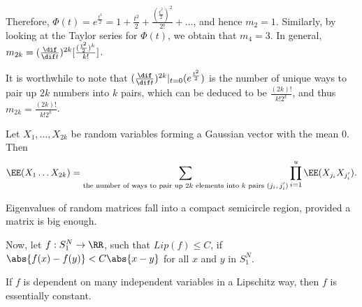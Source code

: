 \documentclass[11pt]{scrartcl}
\begin{document}
  Therefore,
  $\Phi(t) = e^{\frac{t^{2}}{2}} = 1 + \frac{t^{2}}{2} +
  \frac{(\frac{t^{2}}{2})^{2}}{2!} + \dots$, and hence $m_{2} = 1$.
  Similarly, by looking at the Taylor series for $\Phi(t)$, we obtain
  that $m_{4} = 3$. In general,
  $m_{2k} = (\frac{\dif }{\dif
    t})^{2k}[\frac{(\frac{t^{2}}{2})^{k}}{k!}]$.

  It is worthwhile to note that
  $(\frac{\dif }{\dif t})^{2k}|_{t = 0}(e^{\frac{t^{2}}{2}})$ is the
  number of unique ways to pair up $2k$ numbers into $k$ pairs, which
  can be deduced to be $ \frac{(2k)!}{k!2^{k}}$, and thus
  $m_{2k} = \frac{(2k)!}{k!2^{k}}$.

  \begin{theorem}
    Let $X_{1}, \dots, X_{2k}$ be random variables forming a Gaussian
    vector with the mean 0. Then 
    \begin{equation*}
      \EE(X_{1}\dots X_{2k}) = \sum_{\text{the number of ways to pair up $2k$ elements into $k$ pairs $(j_{i}, j'_{i})$}} \prod_{i=1}^{u}\EE(X_{j_{i}}X_{j'_{i}}).
    \end{equation*}

  \end{theorem}

  \begin{theorem}

    Eigenvalues of random matrices fall into a compact semicircle
    region, provided a matrix is big enough.

  \end{theorem}

  Now, let $f:S_{1}^{N} \to \RR$, such that $Lip(f) \leq C$, if
  $\abs{f(x)- f(y)} < C\abs{x-y}$ for all $x$ and $y$ in $S_{1}^{N}$.
  \begin{theorem}
    If $f$ is dependent on many independent variables in a Lipschitz
    way, then $f$ is essentially constant.
  \end{theorem}

  
\end{document}
